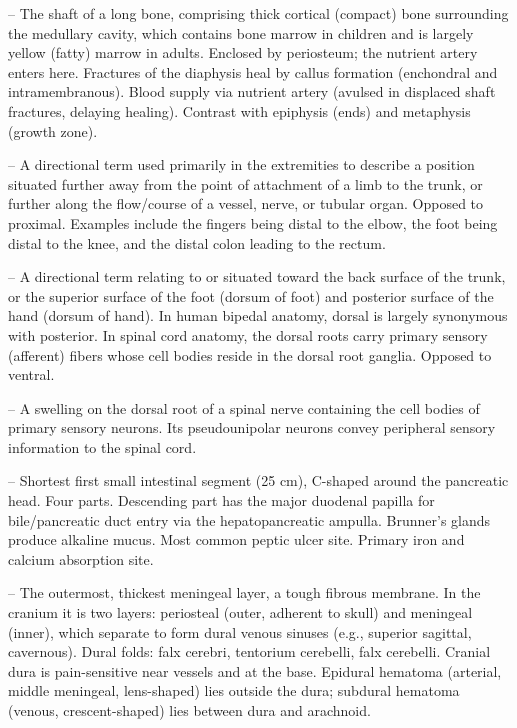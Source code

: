 -- The shaft of a long bone, comprising thick cortical (compact) bone surrounding the medullary cavity, which contains bone marrow in children and is largely yellow (fatty) marrow in adults. Enclosed by periosteum; the nutrient artery enters here. Fractures of the diaphysis heal by callus formation (enchondral and intramembranous). Blood supply via nutrient artery (avulsed in displaced shaft fractures, delaying healing). Contrast with epiphysis (ends) and metaphysis (growth zone).

-- A directional term used primarily in the extremities to describe a position situated further away from the point of attachment of a limb to the trunk, or further along the flow/course of a vessel, nerve, or tubular organ. Opposed to proximal. Examples include the fingers being distal to the elbow, the foot being distal to the knee, and the distal colon leading to the rectum.

-- A directional term relating to or situated toward the back surface of the trunk, or the superior surface of the foot (dorsum of foot) and posterior surface of the hand (dorsum of hand). In human bipedal anatomy, dorsal is largely synonymous with posterior. In spinal cord anatomy, the dorsal roots carry primary sensory (afferent) fibers whose cell bodies reside in the dorsal root ganglia. Opposed to ventral.

-- A swelling on the dorsal root of a spinal nerve containing the cell bodies of primary sensory neurons. Its pseudounipolar neurons convey peripheral sensory information to the spinal cord.

-- Shortest first small intestinal segment (25 cm), C-shaped around the pancreatic head. Four parts. Descending part has the major duodenal papilla for bile/pancreatic duct entry via the hepatopancreatic ampulla. Brunner's glands produce alkaline mucus. Most common peptic ulcer site. Primary iron and calcium absorption site.

-- The outermost, thickest meningeal layer, a tough fibrous membrane. In the cranium it is two layers: periosteal (outer, adherent to skull) and meningeal (inner), which separate to form dural venous sinuses (e.g., superior sagittal, cavernous). Dural folds: falx cerebri, tentorium cerebelli, falx cerebelli. Cranial dura is pain-sensitive near vessels and at the base. Epidural hematoma (arterial, middle meningeal, lens-shaped) lies outside the dura; subdural hematoma (venous, crescent-shaped) lies between dura and arachnoid.

